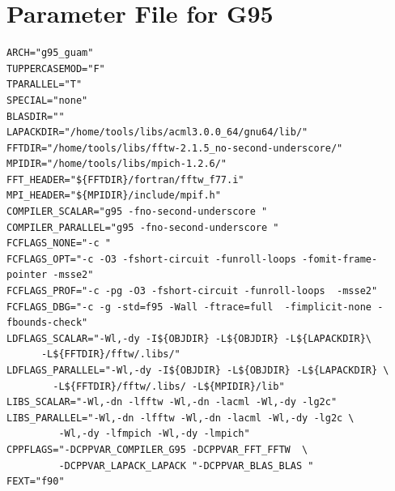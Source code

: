 \documentclass[a4paper,10pt]{report}
\begin{document}
\newpage
\section{Parameter File for G95}
\begin{verbatim}
ARCH="g95_guam"
TUPPERCASEMOD="F"
TPARALLEL="T"
SPECIAL="none"
BLASDIR=""
LAPACKDIR="/home/tools/libs/acml3.0.0_64/gnu64/lib/"
FFTDIR="/home/tools/libs/fftw-2.1.5_no-second-underscore/"
MPIDIR="/home/tools/libs/mpich-1.2.6/"
FFT_HEADER="${FFTDIR}/fortran/fftw_f77.i"
MPI_HEADER="${MPIDIR}/include/mpif.h"
COMPILER_SCALAR="g95 -fno-second-underscore "
COMPILER_PARALLEL="g95 -fno-second-underscore "
FCFLAGS_NONE="-c "
FCFLAGS_OPT="-c -O3 -fshort-circuit -funroll-loops -fomit-frame-pointer -msse2"
FCFLAGS_PROF="-c -pg -O3 -fshort-circuit -funroll-loops  -msse2"
FCFLAGS_DBG="-c -g -std=f95 -Wall -ftrace=full  -fimplicit-none -fbounds-check"
LDFLAGS_SCALAR="-Wl,-dy -I${OBJDIR} -L${OBJDIR} -L${LAPACKDIR}\
      -L${FFTDIR}/fftw/.libs/"
LDFLAGS_PARALLEL="-Wl,-dy -I${OBJDIR} -L${OBJDIR} -L${LAPACKDIR} \
        -L${FFTDIR}/fftw/.libs/ -L${MPIDIR}/lib"
LIBS_SCALAR="-Wl,-dn -lfftw -Wl,-dn -lacml -Wl,-dy -lg2c"
LIBS_PARALLEL="-Wl,-dn -lfftw -Wl,-dn -lacml -Wl,-dy -lg2c \
         -Wl,-dy -lfmpich -Wl,-dy -lmpich"
CPPFLAGS="-DCPPVAR_COMPILER_G95 -DCPPVAR_FFT_FFTW  \
         -DCPPVAR_LAPACK_LAPACK "-DCPPVAR_BLAS_BLAS "
FEXT="f90"
\end{verbatim}

\newpage
\end{document}
